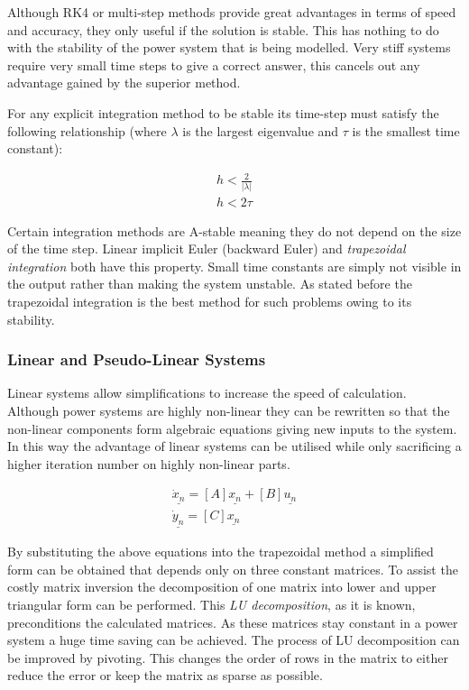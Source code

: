 \documentclass[a4paper,oneside,12pt]{report}
\begin{document}
Although RK4 or multi-step methods provide great advantages in terms of speed and accuracy, they only useful if the solution is stable. This has nothing to do with the stability of the power system that is being modelled. Very stiff systems require very small time steps to give a correct answer, this cancels out any advantage gained by the superior method.

For any explicit integration method to be stable its time-step must satisfy the following relationship (where $\lambda$ is the largest eigenvalue and $\tau$ is the smallest time constant):

\begin{eqnarray}
h < \frac{2}{|\lambda|} \\
h < 2\tau
\end{eqnarray}

Certain integration methods are A-stable meaning they do not depend on the size of the time step. Linear implicit Euler (backward Euler) and \emph{trapezoidal integration} both have this property. Small time constants are simply not visible in the output rather than making the system unstable. As stated before the trapezoidal integration is the best method for such problems owing to its stability.

\subsubsection{Linear and Pseudo-Linear Systems}

Linear systems allow simplifications to increase the speed of calculation. Although power systems are highly non-linear they can be rewritten so that the non-linear components form algebraic equations giving new inputs to the system. In this way the advantage of linear systems can be utilised while only sacrificing a higher iteration number on highly non-linear parts.

\begin{eqnarray}
\underline{\dot{x}_{n}} = [A]\underline{x_n} + [B]\underline{u_n} \label{eqn-linear-state} \\
\underline{\dot{y}_{n}} = [C]\underline{x_n} \label{eqn-linear-output}
\end{eqnarray}

By substituting the above equations into the trapezoidal method a simplified form can be obtained that depends only on three constant matrices. To assist the costly matrix inversion the decomposition of one matrix into lower and upper triangular form can be performed. This \emph{LU decomposition}, as it is known, preconditions the calculated matrices. As these matrices stay constant in a power system a huge time saving can be achieved. The process of LU decomposition can be improved by pivoting. This changes the order of rows in the matrix to either reduce the error or keep the matrix as sparse as possible.
\end{document}
